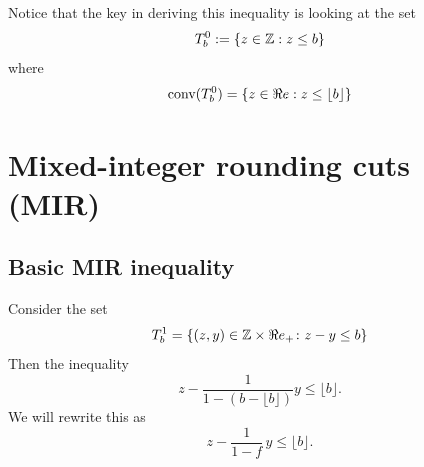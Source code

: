 Notice that the key in deriving this inequality is looking at the set 
\begin{equation}
T^{0}_{b} := \{z \in {\mathbb{Z}} : z \leq b\}
\end{equation}
where 
\begin{equation}
\textup{conv}(T^{0}_{b} ) = \{z \in \Re e : z \leq \lfloor b\rfloor \}
\end{equation}

\begin{figure}[h]
\begin{center}
\end{center}
\end{figure}


\section{Mixed-integer rounding cuts (MIR)}
\subsection{Basic MIR inequality}\label{basicMIR}
%
Consider the set 
\begin{equation}
T^{1}_{b} = \{(z,y) \in {\mathbb{Z}} \times \Re e_{+} \colon z - y \leq b\}
\end{equation}
Then the inequality 
\begin{equation}
z - \frac{1}{1 - (b - \lfloor b \rfloor)} y \leq \lfloor b \rfloor.
\end{equation}
We will rewrite this as 
\begin{equation}
z - \frac{1}{1 - f}\, y \leq \lfloor b \rfloor.
\end{equation}



